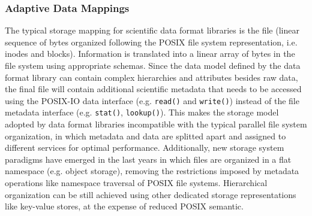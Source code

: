 






\subsubsection{Adaptive Data Mappings}
The typical storage mapping for scientific data format libraries is the file (linear sequence of bytes organized following the POSIX file system representation, i.e. inodes and blocks). Information is translated into a linear array of bytes in the file system using appropriate schemas. Since the data model defined by the data format library can contain complex hierarchies and attributes besides raw data, the final file will contain additional scientific metadata that needs to be accessed using the POSIX-IO data interface (e.g. \texttt{read()} and \texttt{write()}) instead of the file metadata interface (e.g. \texttt{stat()}, \texttt{lookup()}). This makes the storage model adopted by data format libraries incompatible with the typical parallel file system organization, in which metadata and data are splitted apart and assigned to different services for optimal performance. Additionally, new storage system paradigms have emerged in the last years in which files are organized in a flat namespace (e.g. object storage), removing the restrictions imposed by metadata operations like namespace traversal of POSIX file systems. Hierarchical organization can be still achieved using other dedicated storage representations like key-value stores, at the expense of reduced POSIX semantic.

